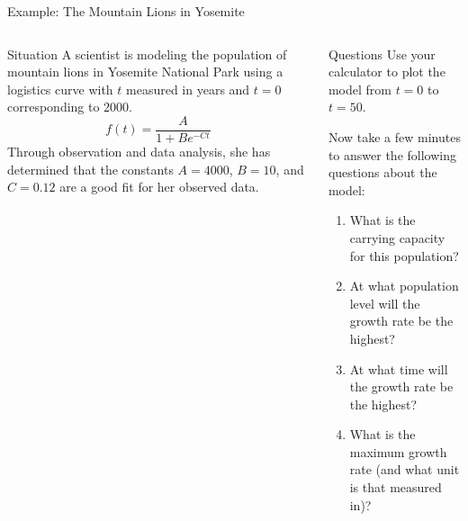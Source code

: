 \documentclass[10pt,aspectratio=1610,xcolor={dvipsnames}]{beamer}
\begin{document}
  \begin{frame}{Example: The Mountain Lions in Yosemite}

    \begin{columns}

      \begin{block}{Situation}
        A scientist is modeling the population of mountain lions in Yosemite National Park using a logistics curve with $t$ measured in years and $t=0$ corresponding to 2000.
        \[
          f(t) = \frac{A}{1 + Be^{-Ct}}
        \]
        Through observation and data analysis, she has determined that the constants $A = 4000$, $B = 10$, and $C = 0.12$ are a good fit for her observed data.
      \end{block}

      \begin{block}{Questions}
        Use your calculator to plot the model from $t = 0$ to $t = 50$.

        Now take a few minutes to answer the following questions about the model:

        \begin{enumerate}
          \item{What is the carrying capacity for this population?}
          \item{At what population level will the growth rate be the highest?}
          \item{At what time will the growth rate be the highest?}
          \item{What is the maximum growth rate (and what unit is that measured in)?}
        \end{enumerate}
      \end{block}

    \end{columns}

  \end{frame}
\end{document}
